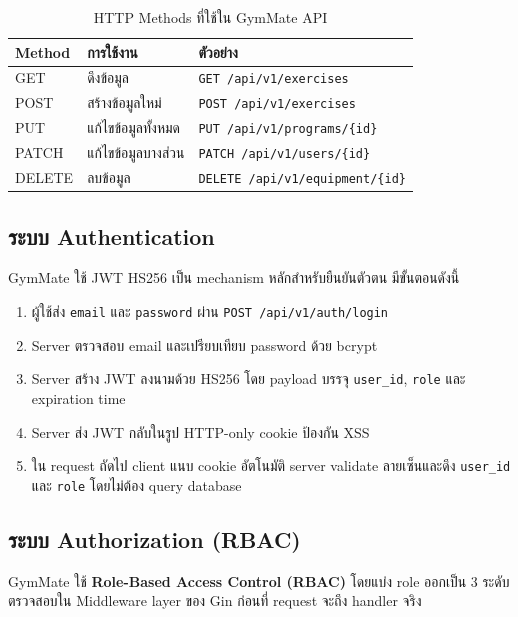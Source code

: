 \begin{table}[h]
\centering
\begin{tabular}{@{}lll@{}}
\toprule
\textbf{Method} & \textbf{การใช้งาน} & \textbf{ตัวอย่าง} \\
\midrule
GET    & ดึงข้อมูล           & \texttt{GET /api/v1/exercises} \\
POST   & สร้างข้อมูลใหม่     & \texttt{POST /api/v1/exercises} \\
PUT    & แก้ไขข้อมูลทั้งหมด  & \texttt{PUT /api/v1/programs/\{id\}} \\
PATCH  & แก้ไขข้อมูลบางส่วน  & \texttt{PATCH /api/v1/users/\{id\}} \\
DELETE & ลบข้อมูล           & \texttt{DELETE /api/v1/equipment/\{id\}} \\
\bottomrule
\end{tabular}
\caption{HTTP Methods ที่ใช้ใน GymMate API}
\label{tab:http-methods}
\end{table}

\subsection{ระบบ Authentication}

GymMate ใช้ JWT HS256 เป็น mechanism หลักสำหรับยืนยันตัวตน มีขั้นตอนดังนี้

\begin{enumerate}
  \item ผู้ใช้ส่ง \texttt{email} และ \texttt{password} ผ่าน \texttt{POST /api/v1/auth/login}
  \item Server ตรวจสอบ email และเปรียบเทียบ password ด้วย bcrypt
  \item Server สร้าง JWT ลงนามด้วย HS256 โดย payload บรรจุ \texttt{user\_id}, \texttt{role} และ expiration time
  \item Server ส่ง JWT กลับในรูป HTTP-only cookie ป้องกัน XSS
  \item ใน request ถัดไป client แนบ cookie อัตโนมัติ server validate ลายเซ็นและดึง \texttt{user\_id} และ \texttt{role} โดยไม่ต้อง query database
\end{enumerate}

\subsection{ระบบ Authorization (RBAC)}

GymMate ใช้ \textbf{Role-Based Access Control (RBAC)} โดยแบ่ง role ออกเป็น 3 ระดับ ตรวจสอบใน Middleware layer ของ Gin ก่อนที่ request จะถึง handler จริง

